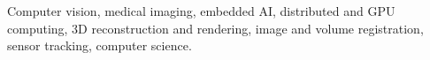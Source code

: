 




Computer vision, medical imaging, embedded AI, distributed and GPU computing, 3D reconstruction and rendering, image and volume registration, sensor tracking, computer science.


